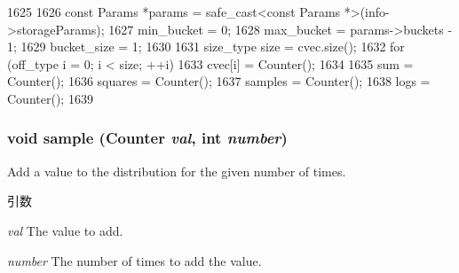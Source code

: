 \begin{DoxyCode}
1625     {
1626         const Params *params = safe_cast<const Params *>(info->storageParams);
1627         min_bucket = 0;
1628         max_bucket = params->buckets - 1;
1629         bucket_size = 1;
1630 
1631         size_type size = cvec.size();
1632         for (off_type i = 0; i < size; ++i)
1633             cvec[i] = Counter();
1634 
1635         sum = Counter();
1636         squares = Counter();
1637         samples = Counter();
1638         logs = Counter();
1639     }
\end{DoxyCode}
\hypertarget{classStats_1_1HistStor_a57fea70de4ed8fee9ec9e9d9cca6f9fa}{
\subsubsection[{sample}]{\setlength{\rightskip}{0pt plus 5cm}void sample ({\bf Counter} {\em val}, \/  int {\em number})}}
\label{classStats_1_1HistStor_a57fea70de4ed8fee9ec9e9d9cca6f9fa}
Add a value to the distribution for the given number of times. 
\begin{DoxyParams}{引数}
\item[{\em val}]The value to add. \item[{\em number}]The number of times to add the value. \end{DoxyParams}




